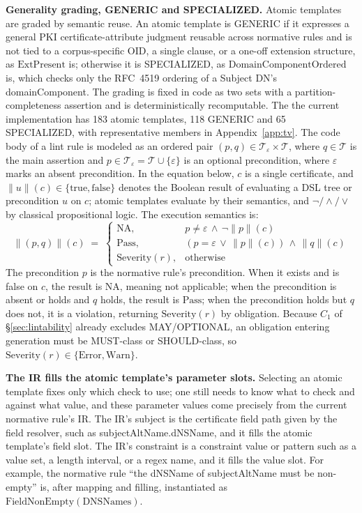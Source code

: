 \textbf{Generality grading, GENERIC and SPECIALIZED.} Atomic templates are
graded by semantic reuse. An atomic template is GENERIC if it expresses a
general PKI certificate-attribute judgment reusable across normative rules and
is not tied to a corpus-specific OID, a single clause, or a one-off extension
structure, as $\mathrm{ExtPresent}$ is; otherwise it is SPECIALIZED, as
$\mathrm{DomainComponentOrdered}$ is, which checks only the RFC~4519 ordering of
a Subject DN's domainComponent. The grading is fixed in code as two sets with a
partition-completeness assertion and is deterministically recomputable. The
the current implementation has 183 atomic templates, 118 GENERIC and 65 SPECIALIZED, with
representative members in Appendix~\ref{app:tv}. The code body of a lint rule is modeled as
an ordered pair $(p, q) \in \mathcal{T}_\varepsilon \times \mathcal{T}$, where
$q \in \mathcal{T}$ is the main assertion and $p \in \mathcal{T}_\varepsilon =
\mathcal{T} \cup \{\varepsilon\}$ is an optional precondition, where $\varepsilon$
marks an absent precondition. In the
equation below, $c$ is a single certificate, and $\lVert u \rVert(c) \in
\{\mathrm{true}, \mathrm{false}\}$ denotes the Boolean result of evaluating a
DSL tree or precondition $u$ on $c$; atomic templates evaluate by their semantics, and
$\neg/\wedge/\vee$ by classical propositional logic. The execution semantics
is:
\begin{equation}\label{eq:exec}
  \lVert (p, q) \rVert(c) \;=\;
  \begin{cases}
    \mathrm{NA}, & p \neq \varepsilon \,\land\, \lnot\lVert p \rVert(c) \\[2pt]
    \mathrm{Pass}, & (p = \varepsilon \,\lor\, \lVert p \rVert(c)) \,\land\,
      \lVert q \rVert(c) \\[2pt]
    \mathrm{Severity}(r), & \text{otherwise}
  \end{cases}
\end{equation}
The precondition $p$ is the normative rule's precondition. When it exists and is
false on $c$, the result is $\mathrm{NA}$, meaning not applicable; when the
precondition is absent or holds and $q$ holds, the result is $\mathrm{Pass}$;
when the precondition holds but $q$ does not, it is a violation, returning
$\mathrm{Severity}(r)$ by obligation. Because $C_1$ of \S\ref{sec:lintability}
already excludes MAY/OPTIONAL, an obligation entering generation must be
MUST-class or SHOULD-class, so $\mathrm{Severity}(r) \in \{\mathrm{Error},
\mathrm{Warn}\}$.

\textbf{The IR fills the atomic template's parameter slots.} Selecting an atomic
template fixes only which check to use; one still needs to know what to check and
against what value, and these parameter values come precisely from the current
normative rule's IR. The IR's subject is the certificate field path given by the
field resolver, such as subjectAltName.dNSName, and it fills the atomic
template's field slot. The IR's constraint is a constraint value or
pattern such as a value set, a length interval, or a regex name, and it fills the value
slot. For example, the normative rule ``the dNSName of subjectAltName must be non-empty''
is, after mapping and filling, instantiated as
$\mathrm{FieldNonEmpty}(\mathrm{DNSNames})$.

